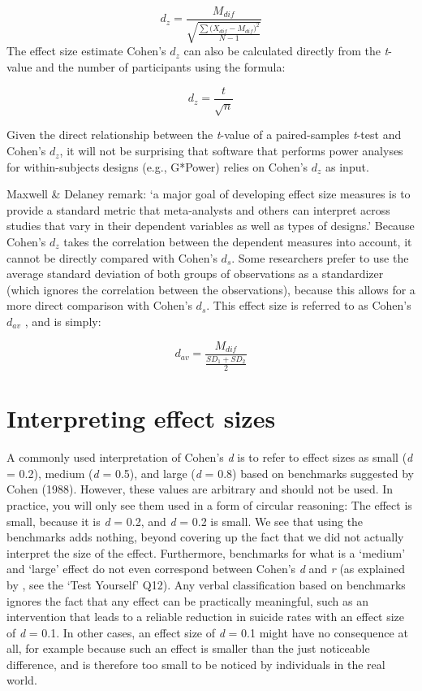 \documentclass[
  oneside]{krantz}
\begin{document}
\[d_z = \frac{M_{dif}}{\sqrt{\frac{\sum{({X_{dif}-M_{dif})}}^2}{N-1}}}\]
The effect size estimate Cohen's \(d_z\) can also be calculated directly from the \emph{t}-value and the number of participants using the formula:

\[d_z = \frac{t}{\sqrt{n}}\]

Given the direct relationship between the \emph{t}-value of a paired-samples \emph{t}-test and Cohen's \(d_z\), it will not be surprising that software that performs power analyses for within-subjects designs (e.g., G*Power) relies on Cohen's \(d_z\) as input.

Maxwell \& Delaney \citeyearpar{maxwell_designing_2004} remark: `a major goal of developing effect size measures is to provide a standard metric that meta-analysts and others can interpret across studies that vary in their dependent variables as well as types of designs.' Because Cohen's \(d_z\) takes the correlation between the dependent measures into account, it cannot be directly compared with Cohen's \(d_s\). Some researchers prefer to use the average standard deviation of both groups of observations as a standardizer (which ignores the correlation between the observations), because this allows for a more direct comparison with Cohen's \(d_s\). This effect size is referred to as Cohen's \(d_{av}\) \citep{cumming_understanding_2013}, and is simply:

\[d_{av} = \frac{M_{dif}}{\frac{SD_1+SD_2}{2}}\]

\hypertarget{interpreting-effect-sizes}{%
\section{Interpreting effect sizes}\label{interpreting-effect-sizes}}

A commonly used interpretation of Cohen's \emph{d} is to refer to effect sizes as small (\emph{d} = 0.2), medium (\emph{d} = 0.5), and large (\emph{d} = 0.8) based on benchmarks suggested by Cohen (1988). However, these values are arbitrary and should not be used. In practice, you will only see them used in a form of circular reasoning: The effect is small, because it is \emph{d} = 0.2, and \emph{d} = 0.2 is small. We see that using the benchmarks adds nothing, beyond covering up the fact that we did not actually interpret the size of the effect. Furthermore, benchmarks for what is a `medium' and `large' effect do not even correspond between Cohen's \emph{d} and \emph{r} (as explained by \citet{mcgrath_when_2006}, see the `Test Yourself' Q12). Any verbal classification based on benchmarks ignores the fact that any effect can be practically meaningful, such as an intervention that leads to a reliable reduction in suicide rates with an effect size of \emph{d} = 0.1. In other cases, an effect size of \emph{d} = 0.1 might have no consequence at all, for example because such an effect is smaller than the just noticeable difference, and is therefore too small to be noticed by individuals in the real world.
\end{document}
